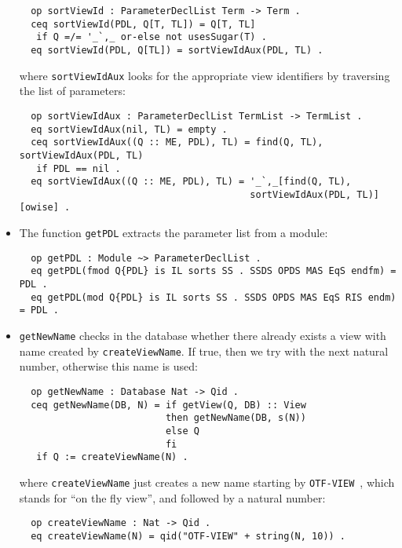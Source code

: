 \begin{itemize}
{\codesize
\begin{verbatim}
  op sortViewId : ParameterDeclList Term -> Term .
  ceq sortViewId(PDL, Q[T, TL]) = Q[T, TL]
   if Q =/= '_`,_ or-else not usesSugar(T) .
  eq sortViewId(PDL, Q[TL]) = sortViewIdAux(PDL, TL) .
\end{verbatim}
}

\noindent
where \verb"sortViewIdAux" looks for the appropriate view identifiers by traversing the
list of parameters:

{\codesize
\begin{verbatim}
  op sortViewIdAux : ParameterDeclList TermList -> TermList .
  eq sortViewIdAux(nil, TL) = empty .
  ceq sortViewIdAux((Q :: ME, PDL), TL) = find(Q, TL), sortViewIdAux(PDL, TL)
   if PDL == nil .
  eq sortViewIdAux((Q :: ME, PDL), TL) = '_`,_[find(Q, TL),
                                         sortViewIdAux(PDL, TL)] [owise] .
\end{verbatim}
}

\item
The function \verb"getPDL" extracts the parameter list from a module:

{\codesize
\begin{verbatim}
  op getPDL : Module ~> ParameterDeclList .
  eq getPDL(fmod Q{PDL} is IL sorts SS . SSDS OPDS MAS EqS endfm) = PDL .
  eq getPDL(mod Q{PDL} is IL sorts SS . SSDS OPDS MAS EqS RIS endm) = PDL .
\end{verbatim}
}

\item
\verb"getNewName" checks in the database whether there already
exists a view with name created by \verb"createViewName". If true, then we try with
the next natural number, otherwise this name is used:

{\codesize
\begin{verbatim}
  op getNewName : Database Nat -> Qid .
  ceq getNewName(DB, N) = if getView(Q, DB) :: View
                          then getNewName(DB, s(N))
                          else Q
                          fi
   if Q := createViewName(N) .
\end{verbatim}
}

\noindent
where \verb"createViewName" just creates a new name starting by
\texttt{OTF-VIEW}~\cite{cafeOBJ2maudeUG}, which stands for ``on the fly view'',
and followed by a natural number:

{\codesize
\begin{verbatim}
  op createViewName : Nat -> Qid .
  eq createViewName(N) = qid("OTF-VIEW" + string(N, 10)) .
\end{verbatim}
}


\end{itemize}
